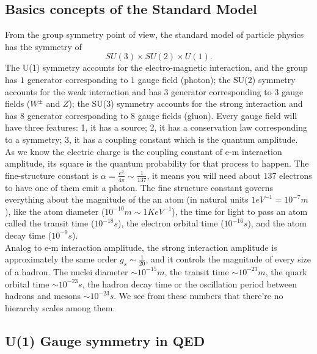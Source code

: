 \documentclass{article}
\newcommand{\subsec}{\subsection}
\newcommand{\be}{\begin{equation}}
\newcommand{\ee}{\end{equation}}
\renewcommand{\1}{\left}
\renewcommand{\2}{\right}
\newcommand{\al}{\alpha}
\begin{document}
\subsec{Basics concepts of the Standard Model}
From the group symmetry point of view, the standard model of particle physics has the symmetry of \be SU(3)\times SU(2) \times U(1).\ee The U(1) symmetry accounts for the electro-magnetic interaction, and the group has $1$ generator corresponding to $1$ gauge field (photon); the SU(2) symmetry accounts for the weak interaction and has $3$ generator corresponding to $3$ gauge fields ($W^\pm$ and $Z$); the SU(3) symmetry accounts for the strong interaction and has $8$ generator corresponding to $8$ gauge fields (gluon). Every gauge field will have three features: 1, it has a source; 2, it has a conservation law corresponding to a symmetry; 3, it has a coupling constant which is the quantum amplitude.\\

As we know the electric charge is the coupling constant of e-m interaction amplitude, its square is the quantum probability for that process to happen. The fine-structure constant is $\al=\frac{e^2}{4\pi}\sim \frac 1{137}$, it means you will need about $137$ electrons to have one of them emit a photon. The fine structure constant governs everything about the magnitude of the an atom (in natural units $1eV^{-1}=10^{-7}m$), like the atom diameter ($10^{-10}m\sim 1KeV^{-1}$), the time for light to pass an atom called the transit time ($10^{-18}s$), the electron orbital time ($10^{-16}s$), and the atom decay time ($10^{-9}s$).\\

Analog to e-m interaction amplitude, the strong interaction amplitude is approximately the same order $g_s\sim \frac1 {20}$, and it controls the magnitude of every size of a hadron. The nuclei diameter $\sim 10^{-15}m$, the transit time $\sim 10^{-23}m$, the quark orbital time $\sim 10^{-23}s$, the hadron decay time or the oscillation period between hadrons and mesons $\sim 10^{-23}s$. We see from these numbers that there're no hierarchy scales among them.\\

\subsection{U(1) Gauge symmetry in QED}
\end{document}
